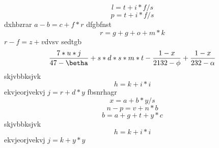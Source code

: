 $$l=t+i*f/s$$ $$p=t+i*f/s$$
dxhbzrar
$a-b=c+f*r$
dfgbfnst
\begin{equation}r=g+g+o+m*k\end{equation}
\(r-f=z+v\)dvsv
sedtgb
\begin{equation}\frac{7*u*j}{47 - \betha} + s*d*s*m*t -\frac{1 - x}{2132 - \phi} + \frac{1 - x}{232 - \alpha}\end{equation}
skjvbbksjvk $$h=k+i*i$$ ekvjeorjvekvj
$j=r+d*y$
fbsnrhagr
$$x=a+b*y/s$$
$$n-p=v+n*b$$
\begin{equation}b=a+g+t+y*c\end{equation}
skjvbbksjvk $$h=k+i*i$$ ekvjeorjvekvj
$j=k+y*y$